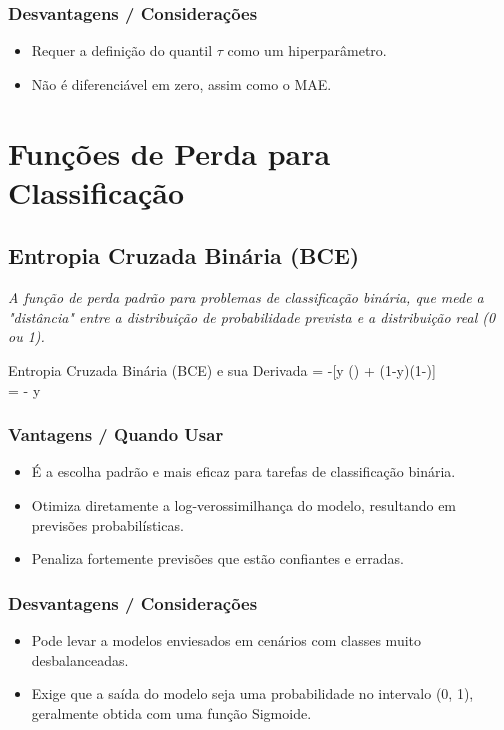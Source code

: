\subsubsection*{Desvantagens / Considerações}
\begin{itemize}
    \item Requer a definição do quantil $\tau$ como um hiperparâmetro.
    \item Não é diferenciável em zero, assim como o MAE.
\end{itemize}

\section{Funções de Perda para Classificação}

\subsection{Entropia Cruzada Binária (BCE)}

\textit{A função de perda padrão para problemas de classificação binária, que mede a "distância" entre a distribuição de probabilidade prevista e a distribuição real (0 ou 1).}

\begin{equacaodestaque}{Entropia Cruzada Binária (BCE) e sua Derivada}
    \Loss = -[y \log() + (1-y)\log(1-)] \\
     =  - y \quad {}
\end{equacaodestaque}

\subsubsection*{Vantagens / Quando Usar}
\begin{itemize}
    \item É a escolha padrão e mais eficaz para tarefas de classificação binária.
    \item Otimiza diretamente a log-verossimilhança do modelo, resultando em previsões probabilísticas.
    \item Penaliza fortemente previsões que estão confiantes e erradas.
\end{itemize}

\subsubsection*{Desvantagens / Considerações}
\begin{itemize}
    \item Pode levar a modelos enviesados em cenários com classes muito desbalanceadas.
    \item Exige que a saída do modelo seja uma probabilidade no intervalo (0, 1), geralmente obtida com uma função Sigmoide.
\end{itemize}

